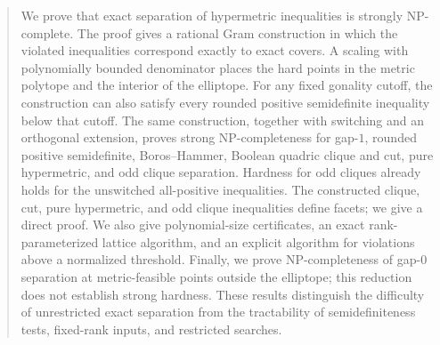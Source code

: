 \begin{abstract}
We prove that exact separation of hypermetric inequalities is strongly
NP-complete.  The proof gives a rational Gram construction in which
the violated inequalities correspond exactly to exact covers.  A
scaling with polynomially bounded denominator places the hard points
in the metric polytope and the interior of the elliptope.  For any
fixed gonality cutoff, the construction can also satisfy every
rounded positive semidefinite inequality below that cutoff.
The same construction, together with switching and an orthogonal
extension, proves strong NP-completeness for gap-$1$, rounded positive
semidefinite, Boros--Hammer, Boolean quadric clique and cut, pure
hypermetric, and odd clique separation.  Hardness for odd cliques
already holds for the unswitched all-positive inequalities.  The
constructed clique, cut, pure hypermetric, and odd clique inequalities
define facets; we give a direct proof.  We also give polynomial-size
certificates, an exact
rank-parameterized lattice algorithm, and an explicit algorithm for
violations above a normalized threshold.  Finally, we prove
NP-completeness of gap-$0$ separation at metric-feasible points outside
the elliptope; this reduction does not establish strong hardness.
These results distinguish the difficulty of unrestricted
exact separation from the tractability of semidefiniteness tests,
fixed-rank inputs, and restricted searches.
\end{abstract}
